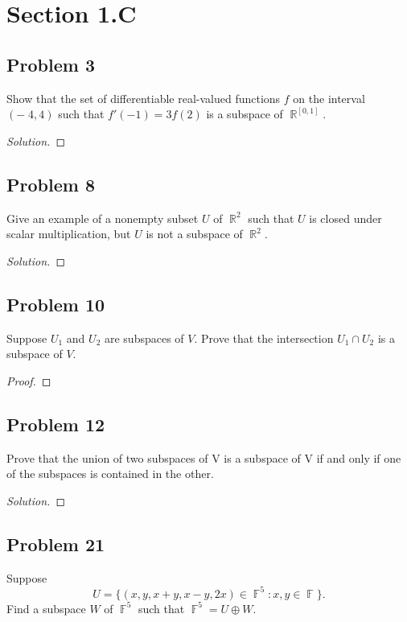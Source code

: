 \documentclass[letterpaper, 12pt]{amsart}
\DeclareMathOperator{\R}{\mathbb{R}}
\DeclareMathOperator{\F}{\mathbb{F}}
\theoremstyle{definition}  %
\begin{document}
	\section*{Section 1.C}	
		\subsection*{Problem 3}
		Show that the set of differentiable real-valued functions $f$ on the interval $(-􏰈4, 4)$ such that $f'(-1) = 3f(2)$ is a subspace of $\R^{[0,1]}$.

		\begin{proof}[Solution]
		\end{proof}

		\subsection*{Problem 8}
		Give an example of a nonempty subset $U$ of $\R^{2}$ such that $U$ is closed under scalar multiplication, but $U$ is not a subspace of $\R^{2}$.

		\begin{proof}[Solution]
		\end{proof}	

		\subsection*{Problem 10}
		Suppose $U_{1}$ and $U_{2}$ are subspaces of $V$. 
		Prove that the intersection $U_{1} \cap U_{2}$ is a subspace of $V$.

		\begin{proof}
		\end{proof}

		\subsection*{Problem 12}
		Prove that the union of two subspaces of V is a subspace of V if and only if one of the subspaces is contained in the other.

		\begin{proof}[Solution]
		\end{proof}		

		\subsection*{Problem 21}
		Suppose $$U = \{ (x,y,x+y,x-y,2x) \in \F^{5} : x, y \in \F \}.$$ 
		Find a subspace $W$ of $\F^{5}$ such that $\F^{5} = U \oplus W$.
\end{document}
